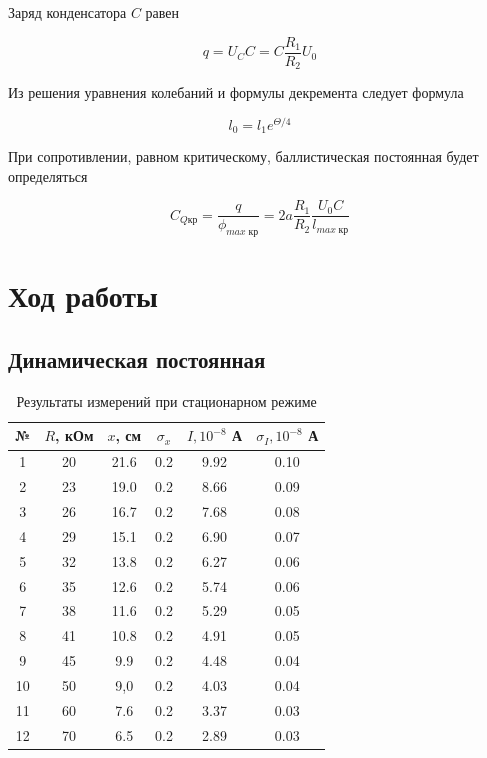 \documentclass[12pt]{kiarticle}
\begin{document}
	 Заряд конденсатора $ C $ равен 
	 
	 \begin{equation}\label{}
	 q = U_C C = C \dfrac{R_1}{R_2}U_0
	 \end{equation}
	 
	 Из решения уравнения колебаний и формулы декремента следует формула 
	 
	 \begin{equation}\label{}
	 l_0 = l_1 e^{\Theta/4}
	 \end{equation}
	 
	 При сопротивлении, равном критическому, баллистическая постоянная будет определяться
	 
	 \begin{equation}
	 C_{Q кр} = \dfrac{q}{\phi_{max \; кр}} = 2a\dfrac{R_1}{R_2}\dfrac{U_0C}{l_{max \; кр}}
	 \label{C}
	 \end{equation}
	 
	 \section{Ход работы}
	 
	 \subsection{Динамическая постоянная}
	 
	 	 \begin{table}[h]
	 	\centering
	 	\caption{Результаты измерений при стационарном режиме}
	 	\begin{tabular}{|c|c|c|c|c|c|}
	 		\hline
	 		№ & $ R $, кОм & $ x $, см & $ \sigma_x $ & $ I, 10^{-8} $ А & $ \sigma_I, 10^{-8} $ А\\
	 		\hline
	 		1 & 20 & 21.6 & 0.2 & 9.92 & 0.10 \\
	 		2 & 23 & 19.0 & 0.2 & 8.66 & 0.09 \\
	 		3 & 26 & 16.7 & 0.2 & 7.68 & 0.08 \\
	 		4 & 29 & 15.1 & 0.2 & 6.90 & 0.07 \\
	 		5 & 32 & 13.8 & 0.2 & 6.27 & 0.06 \\
	 		6 & 35 & 12.6 & 0.2 & 5.74 & 0.06 \\
	 		7 & 38 & 11.6 & 0.2 & 5.29 & 0.05 \\
	 		8 & 41 & 10.8 & 0.2 & 4.91 & 0.05 \\
	 		9 & 45 & 9.9 & 0.2 & 4.48 & 0.04 \\
	 		10 & 50 & 9,0 & 0.2 & 4.03 & 0.04 \\
	 		11 & 60 & 7.6 & 0.2 & 3.37 & 0.03 \\
	 		12 & 70 & 6.5 & 0.2 & 2.89 & 0.03 \\
	 		\hline
	 	\end{tabular}%
	 	\label{resI}%
	 \end{table}%
	 
\end{document}
